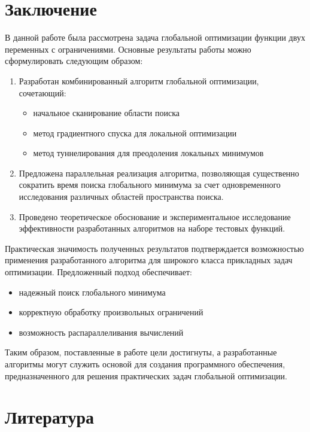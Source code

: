 \documentclass[12pt]{article}
\begin{document}
\section{Заключение}
В данной работе была рассмотрена задача глобальной оптимизации функции двух переменных с ограничениями. Основные результаты работы можно сформулировать следующим образом:

\begin{enumerate}
    \item Разработан комбинированный алгоритм глобальной оптимизации, сочетающий:
    \begin{itemize}
        \item начальное сканирование области поиска
        \item метод градиентного спуска для локальной оптимизации
        \item метод туннелирования для преодоления локальных минимумов
    \end{itemize}
    
    \item Предложена параллельная реализация алгоритма, позволяющая существенно сократить время поиска глобального минимума за счет одновременного исследования различных областей пространства поиска.
    
    \item Проведено теоретическое обоснование и экспериментальное исследование эффективности разработанных алгоритмов на наборе тестовых функций.
\end{enumerate}

Практическая значимость полученных результатов подтверждается возможностью применения разработанного алгоритма для широкого класса прикладных задач оптимизации. Предложенный подход обеспечивает:

\begin{itemize}
    \item надежный поиск глобального минимума
    \item корректную обработку произвольных ограничений
    \item возможность распараллеливания вычислений
\end{itemize}

Таким образом, поставленные в работе цели достигнуты, а разработанные алгоритмы могут служить основой для создания программного обеспечения, предназначенного для решения практических задач глобальной оптимизации.
\newpage

\section{Литература}
\end{document}
